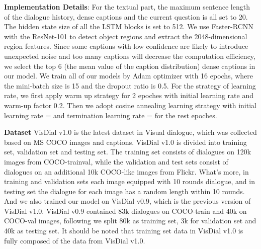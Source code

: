 \documentclass[letterpaper]{article} \usepackage{aaai20}  \usepackage{times}  \usepackage{helvet} \usepackage{courier}  \usepackage[hyphens]{url}  \usepackage{graphicx} \urlstyle{rm} \def\UrlFont{\rm}  \usepackage{graphicx}  \frenchspacing  \setlength{\pdfpagewidth}{8.5in}  \setlength{\pdfpageheight}{11in}  \usepackage{mathrsfs} \usepackage{amsfonts,amssymb}  \usepackage{tabularx} \usepackage{url}
\begin{document}
\textbf{Implementation Details}: For the textual part, the maximum sentence length of the dialogue history,  dense captions and the current question is all set to 20. The hidden state size of all the LSTM blocks is set to 512.  We use Faster-RCNN with the ResNet-101 to detect object regions and extract the 2048-dimensional region features.
Since some captions with low confidence are likely to introduce unexpected noise and too many captions will decrease the computation efficiency, we select the top 6 (the mean value of the caption distribution) dense captions in our model. We train all of our models by Adam optimizer with 16 epochs, where the mini-batch size is 15 and the dropout ratio is  0.5. For the strategy of learning rate, we first apply warm up strategy for 2 epoches with initial learning rate   and warm-up factor 0.2. Then we adopt cosine annealing learning strategy with initial learning rate = and termination learning rate = for the rest epoches. 










\iffalse
\indent\indent\textbf{Dataset} VisDial v1.0 is the latest dataset in Visual dialogue, which was collected based on MS COCO images and captions. VisDial v1.0 is divided into training set, validation set and testing set. The training set consists of dialogues on 120k images from COCO-trainval, while the validation and test sets consist of dialogues on an additional 10k COCO-like images from Flickr.  What's more, in training and validation sets each image equipped with 10 rounds dialogue, and in testing set the dialogue for each image has a random length within 10 rounds. And we also trained our model on VisDial v0.9, which is the previous version of VisDial v1.0. VisDial v0.9 contained 83k dialogues on COCO-train and 40k on COCO-val images, following \cite{Das2017Visual} we split 80k as training set, 3k for validation set and 40k as testing set. It should be noted that training set data in VisDial v1.0 is fully composed of the data from VisDial v1.0.
\end{document}
